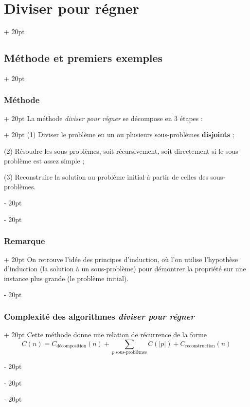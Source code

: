 \documentclass[a4paper, 12pt, twoside]{article}
\newcommand{\abs}[1]{\left\lvert #1 \right\rvert} %
\newcommand{\ind}[1][20pt]{\advance\leftskip + #1}
\newcommand{\deind}[1][20pt]{\advance\leftskip - #1}
\newenvironment{indt}[2][20pt]{#2 \par \ind[#1]}{\par \deind} %
\begin{document}
    \begin{indt}{\section{Diviser pour régner}}
        
        \begin{indt}{\subsection{Méthode et premiers exemples}}
            \begin{indt}{\subsubsection{Méthode}}
                \begin{indt}{La méthode \textit{diviser pour régner} se décompose en 3 étapes :}
                    (1) Diviser le problème en un ou plusieurs sous-problèmes \textbf{disjoints} ;
                    
                    (2) Résoudre les sous-problèmes, soit récursivement, soit directement si le sous-problème est assez simple ;
                    
                    (3) Reconstruire la solution au problème initial à partir de celles des sous-problèmes.
                \end{indt}
            \end{indt}
            
            \vspace{12pt}
            
            \begin{indt}{\subsubsection{Remarque}}
                On retrouve l'idée des principes d'induction, où l'on utilise l'hypothèse d'induction (la solution à un sous-problème) pour démontrer la propriété sur une instance plus grande (le problème initial).
            \end{indt}
            
            \vspace{12pt}
            
            \begin{indt}{\subsubsection{Complexité des algorithmes \textit{diviser pour régner}}}
                Cette méthode donne une relation de récurrence de la forme
                    \[ C(n) = C_{\text{décomposition}}(n) + \sum_{p\ \text{sous-problèmes}} C(\abs p) + C_{\text{reconstruction}}(n) \]
                

\end{indt}
\end{indt}
\end{indt}
\end{document}
